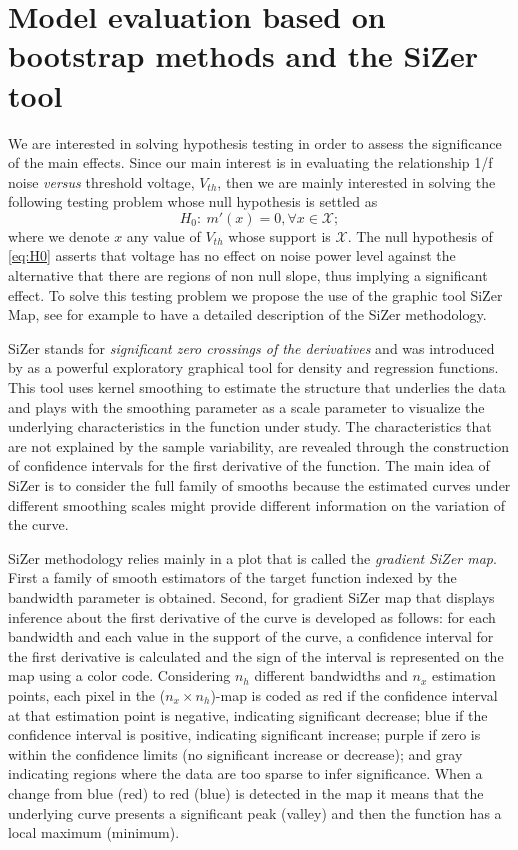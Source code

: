 \documentclass[sn-mathphys]{sn-jnl}%
\theoremstyle{thmstyleone}%
\theoremstyle{thmstyletwo}%
\theoremstyle{thmstylethree}%
\begin{document}
\section{Model evaluation based on bootstrap methods and the SiZer tool}\label{sec:sizer}

\noindent We are interested in solving hypothesis testing in order to assess the significance of the main effects. Since our main interest is in evaluating the relationship 1/f noise \textit{versus} threshold voltage, $V_{th}$, then we are mainly interested in solving the following testing problem whose null hypothesis is settled as
\begin{equation}\label{eq:H0}
	H_0: \   m'(x)=0, \forall x \in \mathcal{X}; 
\end{equation}
where we denote $x$ any value of $V_{th}$ whose support is $\mathcal{X}$. The null hypothesis of \eqref{eq:H0} asserts that voltage has no effect on noise power level against the alternative that there are regions of non null slope, thus implying a significant effect. 
To solve this testing problem we propose the use of the graphic tool SiZer Map, see for example \cite{GNR2020} to have a detailed description of the SiZer methodology.


SiZer stands for \textit{significant zero crossings of the derivatives} and was introduced by \cite{CM1999} as a powerful exploratory graphical tool for density and regression functions. This tool uses kernel smoothing to estimate the structure that underlies the data and plays with the smoothing parameter as a scale parameter to visualize the underlying characteristics in the function under study. The characteristics that are not explained by the sample variability, are revealed through the construction of confidence intervals for the first derivative of the function. The main idea of SiZer is to consider the full family of smooths because the estimated curves under different smoothing scales might provide different information on the variation of the curve. 


SiZer methodology relies mainly in a plot that is called the \textit{gradient SiZer map}. First a family of smooth estimators of the target function indexed by the bandwidth parameter is obtained. Second, for gradient SiZer map that displays inference about the first derivative of the curve is developed as follows: for each bandwidth and each value in the support of the curve, a confidence interval for the first derivative is calculated and the sign of the interval is represented on the map using a color code. Considering $n_h$ different bandwidths and $n_x$ estimation points, each pixel in the ($n_x \times n_h$)-map is coded as red if the confidence interval at that estimation point is negative, indicating significant decrease; blue if the confidence interval is positive, indicating
significant increase; purple if zero is within the confidence limits (no significant increase or decrease); and gray indicating regions where the data are too sparse to infer significance.  When a change from blue (red) to red (blue) is detected in the map it means that the underlying curve presents a significant peak (valley) and then the function has a local maximum (minimum).
\end{document}

